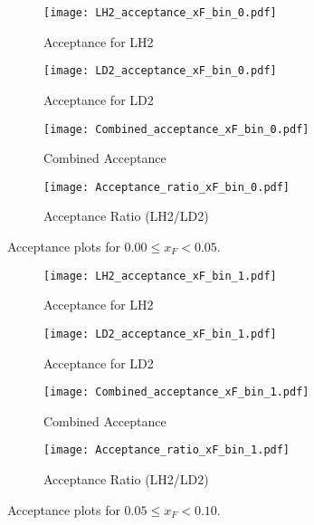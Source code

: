\documentclass{article}
\begin{document}
\begin{figure}[H]
    \centering
    \begin{subfigure}[b]{0.48\textwidth}
       \texttt{[image: LH2\_acceptance\_xF\_bin\_0.pdf]}
       \caption{Acceptance for LH2}
    \end{subfigure}
    \hfill
    \begin{subfigure}[b]{0.48\textwidth}
       \texttt{[image: LD2\_acceptance\_xF\_bin\_0.pdf]}
       \caption{Acceptance for LD2}
    \end{subfigure}

    \begin{subfigure}[b]{0.48\textwidth}
       \texttt{[image: Combined\_acceptance\_xF\_bin\_0.pdf]}
       \caption{Combined Acceptance}
    \end{subfigure}
    \hfill
    \begin{subfigure}[b]{0.48\textwidth}
       \texttt{[image: Acceptance\_ratio\_xF\_bin\_0.pdf]}
       \caption{Acceptance Ratio (LH2/LD2)}
    \end{subfigure}
    \caption{Acceptance plots for $0.00 \le x_F < 0.05$.}
\end{figure}

\begin{figure}[H]
    \centering
    \begin{subfigure}[b]{0.48\textwidth}
       \texttt{[image: LH2\_acceptance\_xF\_bin\_1.pdf]}
       \caption{Acceptance for LH2}
    \end{subfigure}
    \hfill
    \begin{subfigure}[b]{0.48\textwidth}
       \texttt{[image: LD2\_acceptance\_xF\_bin\_1.pdf]}
       \caption{Acceptance for LD2}
    \end{subfigure}

    \begin{subfigure}[b]{0.48\textwidth}
       \texttt{[image: Combined\_acceptance\_xF\_bin\_1.pdf]}
       \caption{Combined Acceptance}
    \end{subfigure}
    \hfill
    \begin{subfigure}[b]{0.48\textwidth}
       \texttt{[image: Acceptance\_ratio\_xF\_bin\_1.pdf]}
       \caption{Acceptance Ratio (LH2/LD2)}
    \end{subfigure}
    \caption{Acceptance plots for $0.05 \le x_F < 0.10$.}
\end{figure}
\end{document}
